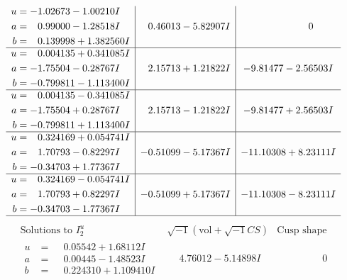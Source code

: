 \documentclass[1p]{elsarticle_modified}
\theoremstyle{definition}
\newcommand{\I}{\sqrt{-1}}
\begin{document}
$$\begin{array}{c|c|c}
\begin{aligned}
u &= -1.02673 - 1.00210 I \\
a &= \phantom{-}0.99000 - 1.28518 I \\
b &= \phantom{-}0.139998 + 1.382560 I\end{aligned}
 & \phantom{-}0.46013 - 5.82907 I & \phantom{-0.000000 } 0 \\ \hline\begin{aligned}
u &= \phantom{-}0.004135 + 0.341085 I \\
a &= -1.75504 - 0.28767 I \\
b &= -0.799811 - 1.113400 I\end{aligned}
 & \phantom{-}2.15713 + 1.21822 I & -9.81477 - 2.56503 I \\ \hline\begin{aligned}
u &= \phantom{-}0.004135 - 0.341085 I \\
a &= -1.75504 + 0.28767 I \\
b &= -0.799811 + 1.113400 I\end{aligned}
 & \phantom{-}2.15713 - 1.21822 I & -9.81477 + 2.56503 I \\ \hline\begin{aligned}
u &= \phantom{-}0.324169 + 0.054741 I \\
a &= \phantom{-}1.70793 - 0.82297 I \\
b &= -0.34703 + 1.77367 I\end{aligned}
 & -0.51099 - 5.17367 I & -11.10308 + 8.23111 I \\ \hline\begin{aligned}
u &= \phantom{-}0.324169 - 0.054741 I \\
a &= \phantom{-}1.70793 + 0.82297 I \\
b &= -0.34703 - 1.77367 I\end{aligned}
 & -0.51099 + 5.17367 I & -11.10308 - 8.23111 I\\
 \hline 
 \end{array}$$\newpage$$\begin{array}{c|c|c}  
\text{Solutions to }I^u_{2}& \I (\text{vol} + \sqrt{-1}CS) & \text{Cusp shape}\\
 \hline 
\begin{aligned}
u &= \phantom{-}0.05542 + 1.68112 I \\
a &= \phantom{-}0.00445 - 1.48523 I \\
b &= \phantom{-}0.224310 + 1.109410 I\end{aligned}
 & \phantom{-}4.76012 - 5.14898 I & \phantom{-0.000000 } 0 \\ \hline\begin{aligned}

\end{aligned}
\end{array}$$
\end{document}
